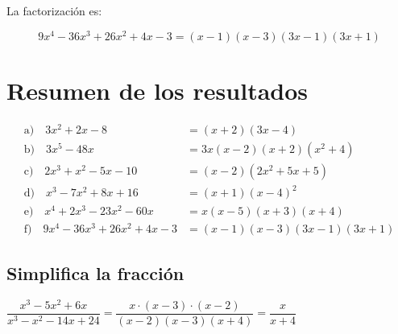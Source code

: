 \documentclass[a4paper,12pt]{article}
\begin{document}
La factorización es:

\[
\boxed{
9x^4-36x^3+26x^2+4x-3
=(x-1)(x-3)(3x-1)(3x+1)
}
\]

\section*{Resumen de los resultados}

\begin{align*}
\text{a)}\quad
3x^2+2x-8
&=(x+2)(3x-4)\\[8pt]
\text{b)}\quad
3x^5-48x
&=3x(x-2)(x+2)(x^2+4)\\[8pt]
\text{c)}\quad
2x^3+x^2-5x-10
&=(x-2)(2x^2+5x+5)\\[8pt]
\text{d)}\quad
x^3-7x^2+8x+16
&=(x+1)(x-4)^2\\[8pt]
\text{e)}\quad
x^4+2x^3-23x^2-60x
&=x(x-5)(x+3)(x+4)\\[8pt]
\text{f)}\quad
9x^4-36x^3+26x^2+4x-3
&=(x-1)(x-3)(3x-1)(3x+1)
\end{align*}

\newpage 
\subsection*{Simplifica la fracción}

$\dfrac{x^3-5x^2+6x}{x^3-x^2-14x+24} = \dfrac{ x \cdot (x-3) \cdot (x-2)}{(x - 2)(x - 3)(x + 4)} = \dfrac{x}{x+4}$
\end{document}
